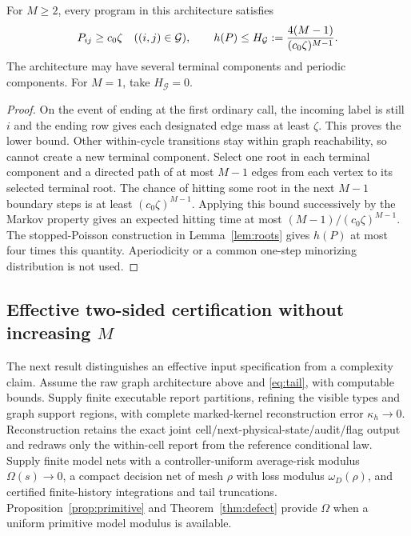 \begin{proposition}\label{prop:graph}
For $M\ge2$, every program in this architecture satisfies
\begin{equation}\label{eq:graphbound}
 P_{ij}\ge c_0\zeta\quad((i,j)\in\mathcal G),\qquad
 h(P)\le H_{\mathcal G}:={4(M-1)\over(c_0\zeta)^{M-1}}.
\end{equation}
The architecture may have several terminal components and periodic components. For $M=1$, take $H_{\mathcal G}=0$.
\end{proposition}
\begin{proof}
On the event of ending at the first ordinary call, the incoming label is still $i$ and the ending row gives each designated edge mass at least $\zeta$. This proves the lower bound. Other within-cycle transitions stay within graph reachability, so cannot create a new terminal component. Select one root in each terminal component and a directed path of at most $M-1$ edges from each vertex to its selected terminal root. The chance of hitting some root in the next $M-1$ boundary steps is at least $(c_0\zeta)^{M-1}$. Applying this bound successively by the Markov property gives an expected hitting time at most $(M-1)/(c_0\zeta)^{M-1}$. The stopped-Poisson construction in Lemma~\ref{lem:roots} gives $h(P)$ at most four times this quantity. Aperiodicity or a common one-step minorizing distribution is not used.
\end{proof}

\subsection{Effective two-sided certification without increasing $M$}
The next result distinguishes an effective input specification from a complexity claim. Assume the raw graph architecture above and \eqref{eq:tail}, with computable bounds. Supply finite executable report partitions, refining the visible types and graph support regions, with complete marked-kernel reconstruction error $\kappa_h\to0$. Reconstruction retains the exact joint cell/next-physical-state/audit/flag output and redraws only the within-cell report from the reference conditional law. Supply finite model nets with a controller-uniform average-risk modulus $\Omega(s)\to0$, a compact decision net of mesh $\rho$ with loss modulus $\omega_D(\rho)$, and certified finite-history integrations and tail truncations. Proposition~\ref{prop:primitive} and Theorem~\ref{thm:defect} provide $\Omega$ when a uniform primitive model modulus is available.


